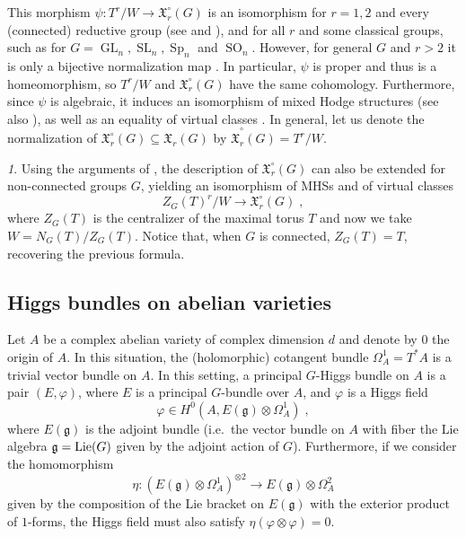 \documentclass[11pt,english]{amsart}
\numberwithin{equation}{section}
\numberwithin{figure}{section}
\theoremstyle{plain}
\theoremstyle{plain}
\theoremstyle{definition}
\theoremstyle{remark}
\newtheorem{rem}[thm]{\protect\remarkname}
\newcommand{\GL}{\operatorname{GL}}
\newcommand{\SL}{\operatorname{SL}}
\newcommand{\SO}{\operatorname{SO}}
\newcommand{\Sp}{\operatorname{Sp}}
\providecommand{\remarkname}{Remark}
\begin{document}
This morphism $\psi: T^{r}/W \to \mathfrak{X}_r^\circ(G)$ is an isomorphism for $r=1,2$ and every (connected) reductive group (see \cite{Si} and \cite[Theorem 6.3.1]{LNY24}), and for all $r$ and some classical groups, such as for $G = \GL_n, \SL_n, \Sp_n$ and $\SO_n$. However, for general $G$ and $r>2$ it is only a bijective normalization map \cite[Theorem 2.1]{Si}. In particular, $\psi$ is proper and thus is a homeomorphism, so $T^{r}/W$ and $\mathfrak{X}_r^\circ(G)$ have the same cohomology. Furthermore, since $\psi$ is algebraic, it induces an isomorphism of mixed Hodge structures (see also \cite[Section 5.1]{FS}), as well as an equality of virtual classes \cite{GPZ}. In general, let us denote the normalization of $\mathfrak{X}_r^\circ(G) \subseteq \mathfrak{X}_r(G)$ by $\hat{\mathfrak{X}}_r^\circ(G) = T^r/W$.





\begin{rem}
Using the arguments of \cite[Corollary 4.16]{GPZ}, the description
of $\mathfrak{X}_r^\circ(G)$ can also be extended for non-connected
groups $G$, yielding an isomorphism of MHSs and of virtual classes 
\[
Z_{G}(T)^{r}/W \to \mathfrak{X}_r^\circ(G)\; ,
\]
where $Z_{G}(T)$ is the centralizer of the maximal torus $T$ and
now we take $W=N_{G}(T)/Z_{G}(T)$. Notice that, when $G$ is connected,
$Z_{G}(T)=T$, recovering the previous formula. 
\end{rem}

\subsection{Higgs bundles on abelian varieties}

Let $A$ be a complex abelian variety of complex dimension $d$ and
denote by $0$ the origin of $A$. In this situation, the (holomorphic) cotangent bundle $\Omega^1_A = T^*A$
is a trivial vector bundle on $A$.
In this setting, a principal $G$-Higgs bundle on $A$ is a pair $(E,\varphi)$, where $E$ is a principal $G$-bundle over $A$, and $\varphi$ is a Higgs field
\[
\varphi\in H^{0}(A,E(\mathfrak{g})\otimes \Omega^1_A)\; ,
\]
where $E(\mathfrak{g})$ is the adjoint bundle (i.e.\ the vector bundle
on $A$ with fiber the Lie algebra $\mathfrak{g}=\textup{Lie}(G)$ given by
the adjoint action of $G$). Furthermore, if we consider the homomorphism 
\[
\eta:(E(\mathfrak{g})\otimes \Omega^1_A)^{\otimes2}\longrightarrow E(\mathfrak{g})\otimes \Omega^{2}_A
\]
given by the composition of the Lie bracket on $E(\mathfrak{g})$
with the exterior product of $1$-forms, the Higgs field must also satisfy $\eta(\varphi\otimes\varphi)=0$.
\end{document}
